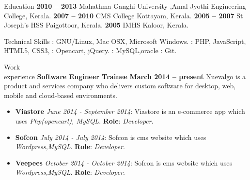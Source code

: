 \documentclass{resume}
\author{Babin Babu}
\begin{document}
\maketitle


\begin{category}{Education}
   \hfill \textbf{2010 -- 2013}
  \citemnobullet Mahathma Ganghi University ,Amal Jyothi Engineering College, Kerala.
   \hfill \textbf{2007 -- 2010}
  \citemnobullet CMS College Kottayam, Kerala.
   \hfill \textbf{2005 -- 2007}
  \citemnobullet St Joseph's HSS Paigottoor, Kerala.
   \hfill \textbf{2005 }
  \citemnobullet IMHS Kaloor, Kerala.
\end{category}




\begin{category}{Technical Skills}
  : GNU/Linux, Mac OSX, Microsoft Windows.
  : PHP, JavaScript, HTML5, CSS3,
  : Opencart, jQuery.
  : MySQL,oracle
  : Git.
\end{category}


\begin{category}{Work \\experience}
  \citemnobullet \textbf{Software Engineer Trainee} \hfill \textbf{March 2014 -- present}
  \citemnobullet Nuevalgo is a product and services company who delivers custom software for desktop, web, mobile and cloud-based environments.
  \begin{itemize}
  \item \textbf{Viastore} {\em June 2014 - September 2014}: Viastore is an e-commerce app which uses {\em Php(opencart),  MySQL}. \textbf{Role}: {\em Developer}.  
  \item \textbf{Sofcon} {\em July 2014 - July 2014}: Sofcon is cms website which uses {\em Wordpress,MySQL}. \textbf{Role}: {\em Developer}.
  \item \textbf{Veepees} {\em October 2014 - October 2014}: Sofcon is cms website which uses {\em Wordpress,MySQL}. \textbf{Role}: {\em Developer}.
  \end{itemize}
  \end{category}
\end{document}
